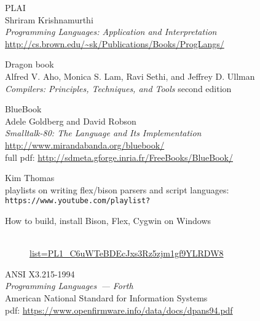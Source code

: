 \begin{thebibliography}{99}

 PLAI\\
Shriram Krishnamurthi\\
\emph{Programming Languages: Application and Interpretation}\\
\url{http://cs.brown.edu/~sk/Publications/Books/ProgLangs/}

 Dragon book\\
Alfred V. Aho, Monica S. Lam, Ravi Sethi, and Jeffrey D. Ullman\\
\emph{Compilers: Principles, Techniques, and Tools} second edition

 BlueBook\\
Adele Goldberg and David Robson\\
\emph{Smalltalk-80: The Language and Its Implementation}\\
\url{http://www.mirandabanda.org/bluebook/}\\
full pdf: \url{http://sdmeta.gforge.inria.fr/FreeBooks/BlueBook/}

Kim Thomas\\playlists on writing flex/bison parsers and script languages:\\
\verb|https://www.youtube.com/playlist?|\\
\begin{description}
\item[How to build, install Bison, Flex, Cygwin on Windows]\ \\
\href{https://www.youtube.com/playlist?list=PL1\_C6uWTeBDEcJxs3Rz5zjm1gf9YLRDW8}{list=PL1\_C6uWTeBDEcJxs3Rz5zjm1gf9YLRDW8}
\item[]
\end{description}

 ANSI X3.215-1994\\
\emph{Programming Languages\ --- Forth}\\
American National Standard for Information Systems\\
pdf: \url{https://www.openfirmware.info/data/docs/dpans94.pdf} 

\end{thebibliography}